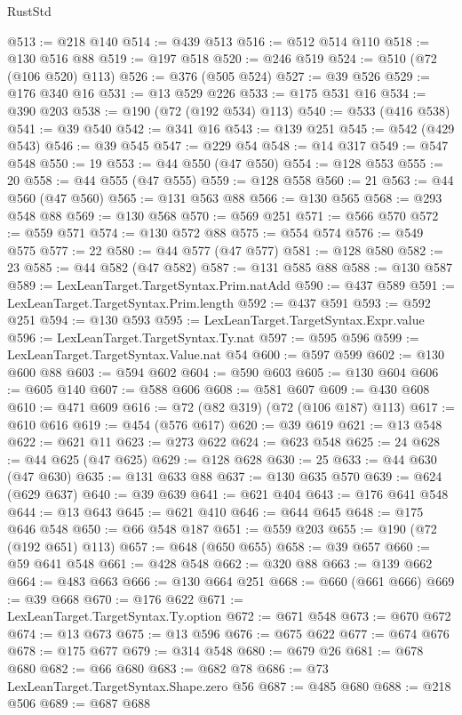 \begin{lexlean}{RustStd}
\begin{coremodule}
@513 := @218 @140
@514 := @439 @513
@516 := @512 @514 @110
@518 := @130 @516 @88
@519 := @197 @518
@520 := @246 @519
@524 := @510 (@72 (@106 @520) @113)
@526 := @376 (@505 @524)
@527 := @39 @526
@529 := @176 @340 @16
@531 := @13 @529 @226
@533 := @175 @531 @16
@534 := @390 @203
@538 := @190 (@72 (@192 @534) @113)
@540 := @533 (@416 @538)
@541 := @39 @540
@542 := @341 @16
@543 := @139 @251
@545 := @542 (@429 @543)
@546 := @39 @545
@547 := @229 @54
@548 := @14 @317
@549 := @547 @548
@550 := 19
@553 := @44 @550 (@47 @550)
@554 := @128 @553
@555 := 20
@558 := @44 @555 (@47 @555)
@559 := @128 @558
@560 := 21
@563 := @44 @560 (@47 @560)
@565 := @131 @563 @88
@566 := @130 @565
@568 := @293 @548 @88
@569 := @130 @568
@570 := @569 @251
@571 := @566 @570
@572 := @559 @571
@574 := @130 @572 @88
@575 := @554 @574
@576 := @549 @575
@577 := 22
@580 := @44 @577 (@47 @577)
@581 := @128 @580
@582 := 23
@585 := @44 @582 (@47 @582)
@587 := @131 @585 @88
@588 := @130 @587
@589 := LexLeanTarget.TargetSyntax.Prim.natAdd
@590 := @437 @589
@591 := LexLeanTarget.TargetSyntax.Prim.length
@592 := @437 @591
@593 := @592 @251
@594 := @130 @593
@595 := LexLeanTarget.TargetSyntax.Expr.value
@596 := LexLeanTarget.TargetSyntax.Ty.nat
@597 := @595 @596
@599 := LexLeanTarget.TargetSyntax.Value.nat @54
@600 := @597 @599
@602 := @130 @600 @88
@603 := @594 @602
@604 := @590 @603
@605 := @130 @604
@606 := @605 @140
@607 := @588 @606
@608 := @581 @607
@609 := @430 @608
@610 := @471 @609
@616 := @72 (@82 @319) (@72 (@106 @187) @113)
@617 := @610 @616
@619 := @454 (@576 @617)
@620 := @39 @619
@621 := @13 @548
@622 := @621 @11
@623 := @273 @622
@624 := @623 @548
@625 := 24
@628 := @44 @625 (@47 @625)
@629 := @128 @628
@630 := 25
@633 := @44 @630 (@47 @630)
@635 := @131 @633 @88
@637 := @130 @635 @570
@639 := @624 (@629 @637)
@640 := @39 @639
@641 := @621 @404
@643 := @176 @641 @548
@644 := @13 @643
@645 := @621 @410
@646 := @644 @645
@648 := @175 @646 @548
@650 := @66 @548 @187
@651 := @559 @203
@655 := @190 (@72 (@192 @651) @113)
@657 := @648 (@650 @655)
@658 := @39 @657
@660 := @59 @641 @548
@661 := @428 @548
@662 := @320 @88
@663 := @139 @662
@664 := @483 @663
@666 := @130 @664 @251
@668 := @660 (@661 @666)
@669 := @39 @668
@670 := @176 @622
@671 := LexLeanTarget.TargetSyntax.Ty.option
@672 := @671 @548
@673 := @670 @672
@674 := @13 @673
@675 := @13 @596
@676 := @675 @622
@677 := @674 @676
@678 := @175 @677
@679 := @314 @548
@680 := @679 @26
@681 := @678 @680
@682 := @66 @680
@683 := @682 @78
@686 := @73 LexLeanTarget.TargetSyntax.Shape.zero @56
@687 := @485 @680
@688 := @218 @506
@689 := @687 @688

\end{coremodule}
\end{lexlean}
